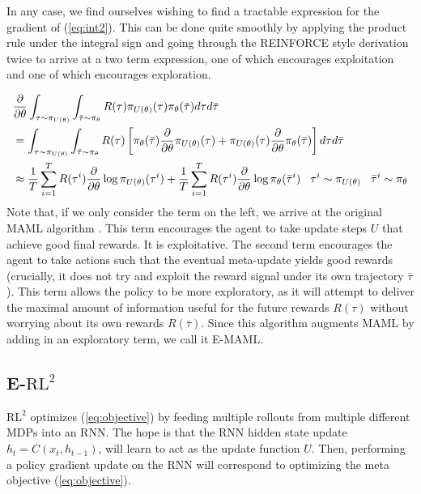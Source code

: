 \documentclass{article} %
\begin{document}
In any case, we find ourselves wishing to find a tractable expression for the gradient of (\ref{eq:int2}). This can be done quite smoothly by applying the product rule under the integral sign and going through the REINFORCE style derivation twice to arrive at a two term expression, one of which encourages exploitation and one of which encourages exploration.

\begin{align*}
& \frac{\partial}{\partial \theta} \int_{\tau \sim \pi_{U(\theta)}} \int_{\bar{\tau} \sim \pi_\theta} R(\tau) \pi_{U(\theta)} (\tau) \pi_\theta (\bar{\tau}) d \tau d \bar{\tau} \\
&= \int_{\tau \sim \pi_{U(\theta)}} \int_{\bar{\tau} \sim \pi_\theta} R(\tau) \left[ \pi_\theta(\bar{\tau}) \frac{\partial}{\partial \theta} \pi_{U(\theta)} (\tau) + \pi_{U(\theta)}(\tau) \frac{\partial}{\partial \theta} \pi_\theta (\bar{\tau}) \right] d \tau d \bar{\tau} \\
& \approx \frac{1}{T} \sum_{i=1}^T R(\tau^{i}) \frac{\partial}{\partial \theta} \log \pi_{U(\theta)} (\tau^i) + \frac{1}{T} \sum_{i=1}^T R(\tau^{i}) \frac{\partial}{\partial \theta} \log \pi_{\theta} (\bar{\tau}^i) \hspace{3mm} \tau^i \sim \pi_{U(\theta)} \hspace{3mm} \bar{\tau}^i \sim \pi_\theta 
\end{align*}
Note that, if we only consider the term on the left, we arrive at the original MAML algorithm \cite{maml}. This term encourages the agent to take update steps $U$ that achieve good final rewards. It is exploitative. The second term encourages the agent to take actions such that the eventual meta-update yields good rewards (crucially, it does not try and exploit the reward signal under its own trajectory $\bar{\tau}$). This term allows the policy to be more exploratory, as it will attempt to deliver the maximal amount of information useful for the future rewards $R(\tau)$ without worrying about its own rewards $R(\bar{\tau})$. Since this algorithm augments MAML by adding in an exploratory term, we call it E-MAML. 


\subsection{E-$\text{RL}^2$}
$\text{RL}^2$ optimizes (\ref{eq:objective}) by feeding multiple rollouts from multiple different MDPs into an RNN. The hope is that the RNN hidden state update $h_t = C(x_t, h_{t-1})$, will learn to act as the update function $U$. Then, performing a policy gradient update on the RNN will correspond to optimizing the meta objective (\ref{eq:objective}). 
\end{document}
